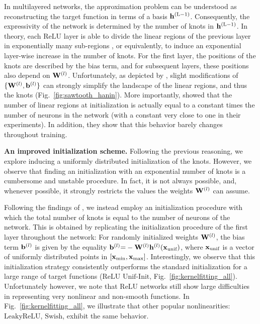 \documentclass{article}
\newcommand{\mat}[1]{\ensuremath{{\mathbf{\MakeUppercase{{#1}}}}}}
\renewcommand{\vec}[1]{\ensuremath{\mathbf{\MakeLowercase{{#1}}}}}
\newcommand{\Wm}{\mat{W}}
\newcommand{\xv}{\vec{x}}
\newcommand{\hv}{\vec{h}}
\newcommand{\bv}{\vec{b}}
\def\Lt{\mathrm{L}}
\begin{document}
In multilayered networks, the approximation problem can be understood as reconstructing the target function in terms of a basis $\hv^{(\Lt-1)}$. Consequently, the expressivity of the network is determined by the number of knots in $\hv^{(\Lt-1)}$. In theory, each $\mathrm{ReLU}$ layer is able to divide the linear regions of the previous layer in exponentially many sub-regions \citep{montufar2014number, serra2018bounding}, or equivalently, to induce an exponential layer-wise increase in the number of knots. For the first layer, the positions of the knots are described by the bias term, and for subsequent layers, these positions also depend on $\Wm^{(l)}$. Unfortunately, as depicted by \citet{hanin2019complexity}, slight modifications of $\{\Wm^{(l)}, \bv^{(l)}\}$ can strongly simplify the landscape of the linear regions, and thus the knots (Fig.~\ref{fig:sawtooth_hanin}). More importantly,  \citet{hanin2019complexity} showed that the number of linear regions at initialization is actually equal to a constant times the number of neurons in the network (with a constant very close to one in their experiments). In addition, they show that this behavior barely changes throughout training.

\textbf{An improved initialization scheme.} Following the previous reasoning, we explore inducing a uniformly distributed initialization of the knots. However, we observe that finding an initialization with an exponential number of knots is a cumbersome and unstable procedure. In fact, it is not always possible, and, whenever possible, it strongly restricts the values the weights $\Wm^{(l)}$ can assume.

Following the findings of \citet{hanin2019complexity}, we instead employ an initialization procedure with which the total number of knots is equal to the number of neurons of the network. 
This is obtained by replicating the initialization procedure of the first layer throughout the network: For randomly initialized weights $\Wm^{(l)}$, the bias term $\bv^{(l)}$ is given by the equality $\bv^{(l)} {=} - \Wm^{(l)} \hv^{(l)}(\xv_{\text{unif}})$, where $\xv_{\text{unif}}$ is a vector of uniformly distributed points in $[\xv_{\text{min}}, \xv_{\text{max}}]$.
Interestingly, we observe that this initialization strategy consistently outperforms the standard initialization for a large range of target functions ($\mathrm{ReLU}$ $\mathrm{Unif}$-$\mathrm{Init}$, Fig.~\ref{fig:kernelfitting_all}). Unfortunately however, we note that $\mathrm{ReLU}$ networks still show large difficulties in representing very nonlinear and non-smooth functions. In Fig.~\ref{fig:kernelfitting_all}, we illustrate that other popular nonlinearities: $\mathrm{LeakyReLU}$, $\mathrm{Swish}$, exhibit the same behavior.
\end{document}
